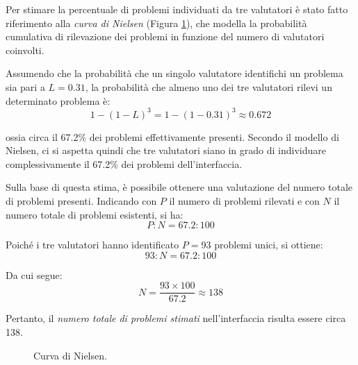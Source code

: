 Per stimare la percentuale di problemi individuati da tre valutatori è stato fatto riferimento alla \textit{curva di Nielsen} (Figura \ref{curva_nielsen}), che modella la probabilità cumulativa di rilevazione dei problemi in funzione del numero di valutatori coinvolti.

Assumendo che la probabilità che un singolo valutatore identifichi un problema sia pari a $L = 0.31$, la probabilità che almeno uno dei tre valutatori rilevi un determinato problema è:
\[
	1 - (1 - L)^3 = 1 - (1 - 0.31)^3 \approx 0.672
\]

ossia circa il 67.2\% dei problemi effettivamente presenti. Secondo il modello di Nielsen, ci si aspetta quindi che tre valutatori siano in grado di individuare complessivamente il 67.2\% dei problemi dell'interfaccia.

Sulla base di questa stima, è possibile ottenere una valutazione del numero totale di problemi presenti. Indicando con $P$ il numero di problemi rilevati e con $N$ il numero totale di problemi esistenti, si ha:
\[
	P : N = 67.2 : 100
\]

\noindent
Poiché i tre valutatori hanno identificato $P = 93$ problemi unici, si ottiene:
\[
	93 : N = 67.2 : 100
\]

\noindent
Da cui segue:
\[
	N = \frac{93 \times 100}{67.2} \approx 138
\]

\noindent
Pertanto, il \textit{numero totale di problemi stimati} nell'interfaccia risulta essere circa 138.

\begin{figure}[H]
	\centering
	\caption{Curva di Nielsen.}
	\label{curva_nielsen}
\end{figure}
